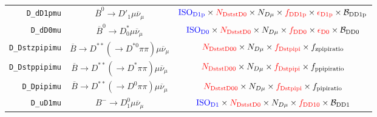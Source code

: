 \begin{landscape}
\begin{table}
\begin{tabular}{r|c|c}
       \texttt{D\_dD1pmu} &               $\overline{B}^0 \rightarrow D'_1 \mu \overline{\nu}_\mu$               &                                                                        $\textcolor{blue}{\text{ISO}_\text{D1p}} \times \textcolor{red}{N_\text{DststD0}} \times N_{D \mu} \times \textcolor{red}{f_\text{DD1p}} \times \textcolor{red}{\epsilon_\text{D1p}} \times \mathcal{B}_\text{DD1p}$                                                                         \\
        \texttt{D\_dD0mu} &              $\overline{B}^0 \rightarrow D^*_0 \mu \overline{\nu}_\mu$               &                                                                          $\textcolor{blue}{\text{ISO}_\text{D0}} \times \textcolor{red}{N_\text{DststD0}} \times N_{D \mu} \times \textcolor{red}{f_\text{DD0}} \times \textcolor{red}{\epsilon_\text{D0}} \times \mathcal{B}_\text{DD0}$                                                                           \\
   \texttt{D\_Dstzpipimu} & $\overline{B} \rightarrow D^{**} (\rightarrow D^{*0} \pi\pi) \mu \overline{\nu}_\mu$ &                                                                                                                      $\textcolor{red}{N_\text{DststD00}} \times N_{D \mu} \times \textcolor{red}{f_\text{Dstpipi}} \times f_\text{zpipiratio}$                                                                                                                      \\
   \texttt{D\_Dstppipimu} &  $\overline{B} \rightarrow D^{**} (\rightarrow D^* \pi\pi) \mu \overline{\nu}_\mu$   &                                                                                                                      $\textcolor{red}{N_\text{DststD00}} \times N_{D \mu} \times \textcolor{red}{f_\text{Dstpipi}} \times f_\text{ppipiratio}$                                                                                                                      \\
      \texttt{D\_Dpipimu} &  $\overline{B} \rightarrow D^{**} (\rightarrow D^0 \pi\pi) \mu \overline{\nu}_\mu$   &                                                                                                                      $\textcolor{red}{N_\text{DststD00}} \times N_{D \mu} \times \textcolor{red}{f_\text{Dstpipi}} \times f_\text{pipiratio}$                                                                                                                       \\
        \texttt{D\_uD1mu} &                    $B^- \rightarrow D_1^0 \mu \overline{\nu}_\mu$                    &                                                                                               $\textcolor{blue}{\text{ISO}_\text{D1}} \times \textcolor{red}{N_\text{DststD0}} \times N_{D \mu} \times \textcolor{red}{f_\text{DD10}} \times \mathcal{B}_\text{DD1}$                                                                                                \\

\end{tabular}
\end{table}
\end{landscape}

